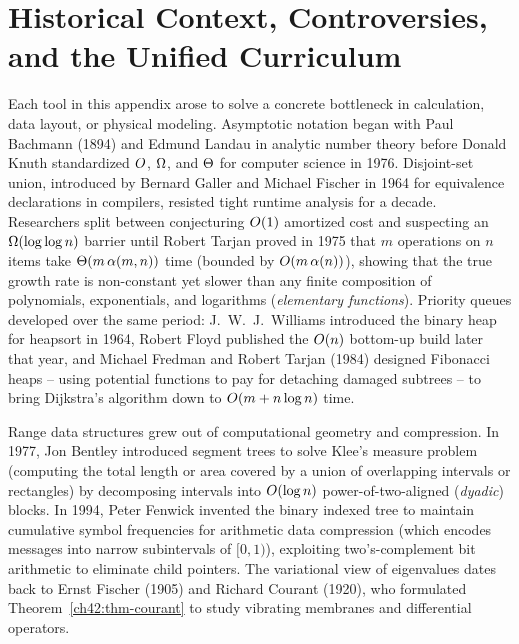 \section{Historical Context, Controversies, and the Unified Curriculum}

\begin{historybox}
Each tool in this appendix arose to solve a concrete bottleneck in calculation, data layout, or physical modeling. Asymptotic notation began with Paul Bachmann (1894) and Edmund Landau in analytic number theory before Donald Knuth standardized $O$, $\Omega$, and $\Theta$ for computer science in 1976. Disjoint-set union, introduced by Bernard Galler and Michael Fischer in 1964 for equivalence declarations in compilers, resisted tight runtime analysis for a decade. Researchers split between conjecturing $O(1)$ amortized cost and suspecting an $\Omega(\log\log n)$ barrier until Robert Tarjan proved in 1975 that $m$ operations on $n$ items take $\Theta(m\,\alpha(m,n))$ time (bounded by $O(m\,\alpha(n))$), showing that the true growth rate is non-constant yet slower than any finite composition of polynomials, exponentials, and logarithms (\emph{elementary functions}). Priority queues developed over the same period: J.~W.~J.~Williams introduced the binary heap for heapsort in 1964, Robert Floyd published the $O(n)$ bottom-up build later that year, and Michael Fredman and Robert Tarjan (1984) designed Fibonacci heaps -- using potential functions to pay for detaching damaged subtrees -- to bring Dijkstra's algorithm down to $O(m + n\log n)$ time.

Range data structures grew out of computational geometry and compression. In 1977, Jon Bentley introduced segment trees to solve Klee's measure problem (computing the total length or area covered by a union of overlapping intervals or rectangles) by decomposing intervals into $O(\log n)$ power-of-two-aligned (\emph{dyadic}) blocks. In 1994, Peter Fenwick invented the binary indexed tree to maintain cumulative symbol frequencies for arithmetic data compression (which encodes messages into narrow subintervals of $[0,1)$), exploiting two's-complement bit arithmetic to eliminate child pointers. The variational view of eigenvalues dates back to Ernst Fischer (1905) and Richard Courant (1920), who formulated Theorem~\ref{ch42:thm-courant} to study vibrating membranes and differential operators.


\end{historybox}
